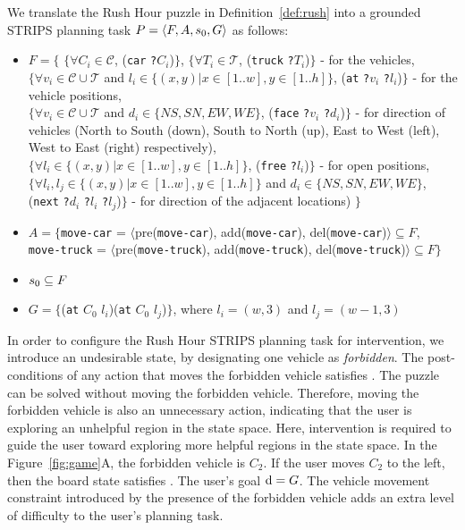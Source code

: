 We translate the Rush Hour puzzle in Definition~\ref{def:rush} into a grounded STRIPS planning task $P=\langle F, A, s_0, G\rangle$ as follows:
\begin{itemize}
\item $F=\lbrace$ 
$\lbrace \forall C_i \in \mathcal{C}$, (\texttt{car} \texttt{?}$C_i$)$\rbrace$, 
$\lbrace \forall T_i \in \mathcal{T}$, (\texttt{truck} \texttt{?}$T_i$)$\rbrace$  - for the vehicles,\\
$\lbrace \forall v_i \in \mathcal{C}\cup \mathcal{T}$ and $l_i\in \lbrace(x,y)|x\in \left[ 1..w\right ], y \in \left[ 1..h\right] \rbrace$, (\texttt{at} \texttt{?}$v_i$ \texttt{?}$l_i$)$\rbrace$ - for the vehicle positions,\\
$\lbrace \forall v_i \in \mathcal{C}\cup \mathcal{T}$ and $d_i\in \lbrace NS, SN, EW, WE \rbrace$, (\texttt{face} \texttt{?}$v_i$ \texttt{?}$d_i$)$\rbrace$ - for direction of vehicles (North to South (down), South to North (up), East to West (left), West to East (right) respectively),\\
$\lbrace \forall l_i\in \lbrace(x,y)|x\in \left[ 1..w\right ], y \in \left[ 1..h\right]\rbrace$, (\texttt{free} \texttt{?}$l_i$)$\rbrace$ - for open positions,\\
$\lbrace \forall l_i, l_j\in \lbrace(x,y)|x\in \left[ 1..w\right ], y \in \left[ 1..h\right]\rbrace$ and $d_i\in \lbrace NS, SN, EW, WE \rbrace$, (\texttt{next} \texttt{?}$d_i$ \texttt{?}$l_i$ \texttt{?}$l_j$)$\rbrace$ - for direction of the adjacent locations)
$\rbrace$

\item $A = \lbrace$\texttt{move-car} = $\langle$pre(\texttt{move-car}), add(\texttt{move-car}), del(\texttt{move-car})$\rangle \subseteq F$, \\
\texttt{move-truck} = $\langle$pre(\texttt{move-truck}), add(\texttt{move-truck}), del(\texttt{move-truck})$\rangle \subseteq F  \rbrace$
\item $s_0 \subseteq F$
\item $G = \lbrace$(\texttt{at} $C_0$ $l_i$)(\texttt{at} $C_0$ $l_j$)$\rbrace$, where $l_i=(w,3)$ and $l_j=(w-1,3)$
\end{itemize}


In order to configure the Rush Hour STRIPS planning task for intervention, we introduce an undesirable state, \undesired by designating one vehicle as \textit{forbidden}. 
The post-conditions of any action that moves the forbidden vehicle satisfies \undesired. 
The puzzle can be solved without moving the forbidden vehicle.
Therefore, moving the forbidden vehicle is also an unnecessary action, indicating that the user is exploring an unhelpful region in the state space.
Here, intervention is required to guide the user toward exploring more helpful regions in the state space.
In the Figure~\ref{fig:game}A, the forbidden vehicle is $C_2$. If the user moves $C_2$ to the left, then the board state satisfies \undesired.
The user's goal $\mathrm{d} = G$.
The vehicle movement constraint introduced by the presence of the forbidden vehicle adds an extra level of difficulty to the user's planning task. 

